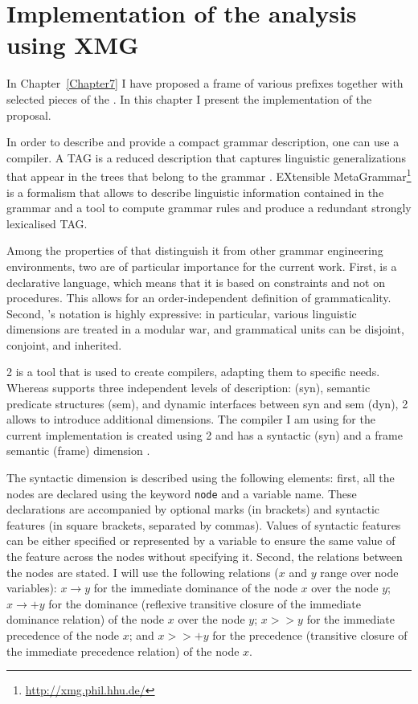 
\chapter{Implementation of the analysis using XMG} %
\label{Chapter8}
In Chapter~\ref{Chapter7} I have proposed a frame  of various prefixes together with selected pieces of the . In this chapter I present the implementation of the proposal.

 In order to describe and provide a compact grammar description, one can use a  compiler. A TAG  is a reduced description that captures linguistic generalizations that appear in the trees that belong to the grammar \citep{Candito:99}. EXtensible MetaGrammar\footnote{\url{http://xmg.phil.hhu.de/}} \citep[][]{Crabbe:13} is a formalism that allows to describe linguistic information contained in the grammar and a tool to compute grammar rules and produce a redundant strongly lexicalised TAG. 
 
Among the properties of  that distinguish it from other grammar engineering environments, two are of particular importance for the current work. First,  is a declarative language, which means that it is based on constraints and not on procedures. This allows for an order-independent definition of grammaticality. Second, 's notation is highly expressive: in particular, various linguistic dimensions are treated in a modular war, and grammatical units can be disjoint, conjoint, and inherited.
 
  2 \citep{Petitjean:16} is a tool that is used to create  compilers, adapting them to specific needs. Whereas  supports three independent levels of description:  (syn), semantic predicate structures (sem), and dynamic interfaces between syn and sem (dyn),  2 allows to introduce additional dimensions. The compiler I am using for the current implementation is created using  2 and has a syntactic (syn) and a frame semantic (frame) dimension  \citep{Lichte:15}.

The syntactic dimension is described using the following elements: first, all the nodes are declared using the keyword \texttt{node} and a variable name. These declarations are accompanied by optional marks (in brackets) and syntactic features (in square brackets, separated by commas). Values of syntactic features can be either specified or represented by a variable to ensure the same value of the feature across the nodes without specifying it. Second, the relations between the nodes are stated. I will use the following relations ($x$ and $y$ range over node variables): $x \rightarrow y$ for the immediate dominance of the node $x$ over the node $y$; $x \rightarrow + y$ for the dominance (reflexive transitive closure of the immediate dominance relation) of the node $x$ over the node $y$; 
$x >> y$ for the immediate precedence of the node $x$; and $x >>+ y$ for the precedence (transitive closure of the immediate precedence relation) of the node $x$.

